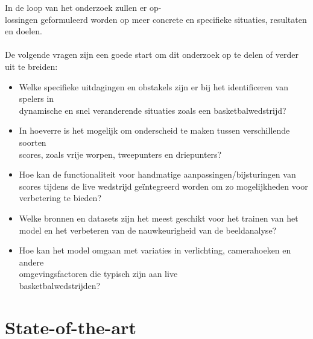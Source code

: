 In de loop van het onderzoek zullen er op-\\lossingen geformuleerd worden op meer concrete en specifieke situaties, resultaten en doelen. \\\\De volgende vragen zijn een goede start om dit onderzoek op te delen of verder uit te breiden:
\begin{itemize}
    \item Welke specifieke uitdagingen en obstakels zijn er bij het identificeren van spelers in \\dynamische en snel veranderende situaties zoals een basketbalwedstrijd?
    \item In hoeverre is het mogelijk om onderscheid te maken tussen verschillende soorten \\scores, zoals vrije worpen, tweepunters en driepunters?
    \item Hoe kan de functionaliteit voor handmatige aanpassingen/bijsturingen van scores tijdens de live wedstrijd geïntegreerd worden om zo mogelijkheden voor verbetering te bieden?
    \item Welke bronnen en datasets zijn het meest geschikt voor het trainen van het model en het verbeteren van de nauwkeurigheid van de beeldanalyse?
    \item Hoe kan het model omgaan met variaties in verlichting, camerahoeken en andere \\omgevingsfactoren die typisch zijn aan live \\basketbalwedstrijden?
\end{itemize}



\section{State-of-the-art}%
\label{sec:state-of-the-art}



